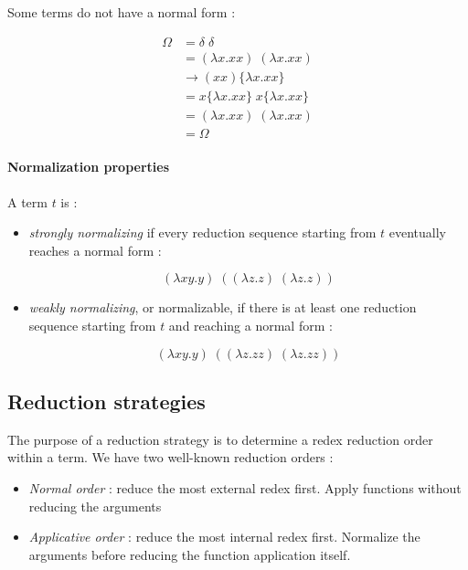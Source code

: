   Some terms do not have a normal form :

  \begin{align*}
    \Omega &= \delta\;\delta \\
          &= (\lambda x.xx)\; (\lambda x.xx) \\
          &\to (xx)\{\lambda x.xx\} \\
          &= x\{\lambda x.xx\}\;x\{\lambda x.xx\} \\
          &= (\lambda x.xx)\; (\lambda x.xx) \\
          &= \Omega
  \end{align*}

  \paragraph{Normalization properties} A term $t$ is :

  \begin{itemize}
    \item \textit{strongly normalizing} if every reduction sequence starting
      from $t$ eventually reaches a normal form :

      \[(\lambda xy.y)\;((\lambda z.z)\;(\lambda z.z))\]

    \item \textit{weakly normalizing}, or normalizable, if there is at least one
      reduction sequence starting from $t$ and reaching a normal form :

      \[(\lambda xy.y)\;((\lambda z.zz)\;(\lambda z.zz))\]
  \end{itemize}

  \subsection{Reduction strategies}

  The purpose of a reduction strategy is to determine a redex reduction order
  within a term. We have two well-known reduction orders :

  \begin{itemize}
    \item \textit{Normal order} : reduce the most external redex first. Apply
      functions without reducing the arguments
    \item \textit{Applicative order} : reduce the most internal redex first.
      Normalize the arguments before reducing the function application itself.
  \end{itemize}


